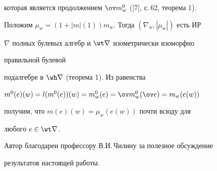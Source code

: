 \begin{pf}
которая является продолжением $\ov m^0_w$ ([7], с.\,62, теорема 1).  


 


Положим $\mu_w=(1+|m|(1))m_w$. Тогда $(\nabla_w,|\mu_w|)$ есть ИР 


$\nabla$ полных булевых алгебр и $\wt\nabla$ изометрически изоморфно 


правильной булевой  


подалгебре в $\wh\nabla$ (теорема 1). Из равенства 


$m^0(e)(w)=l(m^0(e))(w)=m^0_w(e)=\ov m^0_w(\ov e)=m_w(e(w))$ 


получим, что $m(e)(w)=\mu_w(e(w))$ почти всюду для  


любого $e\in\wt\nabla$. 


\end{pf} 


 


Автор благодарен профессору В.И.\,Чилину за полезное обсуждение  


результатов настоящей работы. 


 


